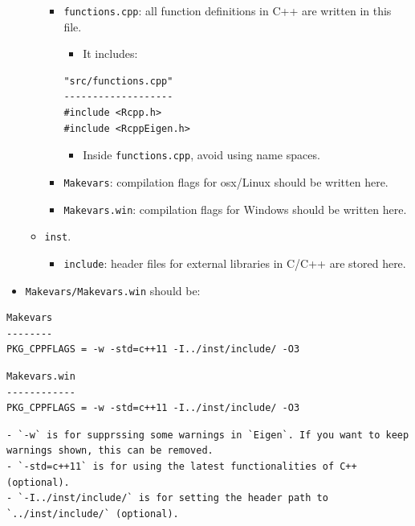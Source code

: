 \documentclass[
]{book}
\providecommand{\tightlist}{%
  \setlength{\itemsep}{0pt}\setlength{\parskip}{0pt}}
\begin{document}
\begin{itemize}
\begin{itemize}
    \begin{itemize}
    \tightlist
    \item
      \texttt{functions.cpp}: all function definitions in C++ are written in this file.

      \begin{itemize}
      \tightlist
      \item
        It includes:
      \end{itemize}

\begin{verbatim}
"src/functions.cpp"
-------------------
#include <Rcpp.h>
#include <RcppEigen.h>
\end{verbatim}

      \begin{itemize}
      \tightlist
      \item
        Inside \texttt{functions.cpp}, avoid using name spaces.
      \end{itemize}
    \item
      \texttt{Makevars}: compilation flags for osx/Linux should be written here.
    \item
      \texttt{Makevars.win}: compilation flags for Windows should be written here.
    \end{itemize}
  \item
    \texttt{inst}.

    \begin{itemize}
    \tightlist
    \item
      \texttt{include}: header files for external libraries in C/C++ are stored here.
    \end{itemize}
  \end{itemize}
\item
  \texttt{Makevars/Makevars.win} should be:
\end{itemize}

\begin{verbatim}
Makevars
--------
PKG_CPPFLAGS = -w -std=c++11 -I../inst/include/ -O3
\end{verbatim}

\begin{verbatim}
Makevars.win
------------
PKG_CPPFLAGS = -w -std=c++11 -I../inst/include/ -O3
\end{verbatim}

\begin{verbatim}
- `-w` is for supprssing some warnings in `Eigen`. If you want to keep warnings shown, this can be removed.
- `-std=c++11` is for using the latest functionalities of C++ (optional).
- `-I../inst/include/` is for setting the header path to `../inst/include/` (optional).
\end{verbatim}
\end{document}
